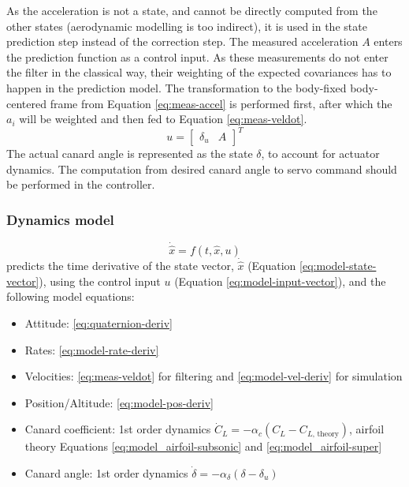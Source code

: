 As the acceleration is not a state, and cannot be directly computed from the other states (aerodynamic modelling is too indirect), it is used in the state prediction step instead of the correction step. 
The measured acceleration $A$ enters the prediction function as a control input.
As these measurements do not enter the filter in the classical way, their weighting of the expected covariances has to happen in the prediction model.
The transformation to the body-fixed body-centered frame from Equation \ref{eq:meas-accel} is performed first, after which the $a_i$ will be weighted and then fed to Equation \ref{eq:meas-veldot}.
\begin{equation}
    u =  \begin{bmatrix}
    \delta_u & A
    \end{bmatrix}^T
    \label{eq:model-input-vector}
\end{equation}
The actual canard angle is represented as the state $\delta$, to account for actuator dynamics.
The computation from desired canard angle to servo command should be performed in the controller. 

\subsubsection{Dynamics model}
\begin{equation}
    \dot{\hat x} = f(t, \hat x, u) \nonumber
\end{equation}
predicts the time derivative of the state vector, $\dot{\hat x}$ (Equation \ref{eq:model-state-vector}), using the control input $u$ (Equation \ref{eq:model-input-vector}), and the following model equations:
\begin{itemize}
    \item Attitude: \ref{eq:quaternion-deriv}
    \item Rates: \ref{eq:model-rate-deriv}
    \item Velocities: \ref{eq:meas-veldot} for filtering and \ref{eq:model-vel-deriv} for simulation
    \item Position/Altitude: \ref{eq:model-pos-deriv}
    \item Canard coefficient: 1st order dynamics $\dot C_L = -\alpha_c (C_L - C_{L\text{, theory}})$, airfoil theory Equations \ref{eq:model_airfoil-subsonic} and \ref{eq:model_airfoil-super}
    \item Canard angle: 1st order dynamics $\dot \delta = -\alpha_\delta (\delta - \delta_u)$
\end{itemize}

